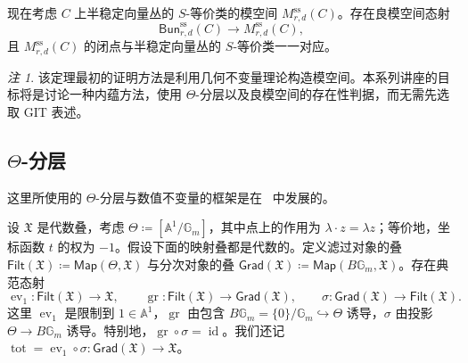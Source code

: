 \documentclass{amsart}
\theoremstyle{definition}
\theoremstyle{remark}
\newtheorem{rmk}[thm]{注}
\theoremstyle{plain}
\theoremstyle{definition}
\theoremstyle{remark}
\newcommand{\A}{\mathbb{A}}
\newcommand{\G}{\mathbb{G}}
\newcommand{\mf}[1]{\mathfrak{#1}}
\newcommand{\mr}[1]{\mathrm{#1}}
\newcommand{\on}[1]{\operatorname{#1}}
\newcommand{\ms}[1]{\mathsf{#1}}
\newcommand{\1}{\mathbf{1}}
\newcommand{\2}{\mathbf{2}}
\newcommand{\3}{\mathbf{3}}
\DeclareMathOperator{\ev}{ev}
\begin{document}
现在考虑 \(C\) 上半稳定向量丛的 \(S\)-等价类的模空间 \(M_{r,d}^{\mr{ss}}(C)\)。存在良模空间态射
\[
    \ms{Bun}_{r,d}^{\mr{ss}}(C)\longrightarrow M_{r,d}^{\mr{ss}}(C),
\]
且 \(M_{r,d}^{\mr{ss}}(C)\) 的闭点与半稳定向量丛的 \(S\)-等价类一一对应。

\begin{rmk}
    该定理最初的证明方法是利用几何不变量理论构造模空间。本系列讲座的目标将是讨论一种内蕴方法，使用 \(\Theta\)-分层以及良模空间的存在性判据，而无需先选取 GIT 表述。
\end{rmk}


\subsection{\(\Theta\)-分层}%
\label{sub:Theta-stratifications}

这里所使用的 \(\Theta\)-分层与数值不变量的框架是在~\cite{HLinstability} 中发展的。

设 \(\mf{X}\) 是代数叠，考虑 \(\Theta\coloneqq[\A^1/\G_m]\)，其中点上的作用为 \(\lambda\cdot z=\lambda z\)；等价地，坐标函数 \(t\) 的权为 \(-1\)。假设下面的映射叠都是代数的。定义滤过对象的叠 \(\ms{Filt}(\mf{X})\coloneqq\ms{Map}(\Theta,\mf{X})\) 与分次对象的叠 \(\ms{Grad}(\mf{X})\coloneqq\ms{Map}(B\G_m,\mf{X})\)。存在典范态射
\[
    \ev_1\colon\ms{Filt}(\mf{X})\to\mf{X},
    \qquad
    \on{gr}\colon\ms{Filt}(\mf{X})\to\ms{Grad}(\mf{X}),
    \qquad
    \sigma\colon\ms{Grad}(\mf{X})\to\ms{Filt}(\mf{X}).
\]
这里 \(\ev_1\) 是限制到 \(1\in\A^1\)，\(\on{gr}\) 由包含 \(B\G_m=\{0\}/\G_m\hookrightarrow\Theta\) 诱导，\(\sigma\) 由投影 \(\Theta\to B\G_m\) 诱导。特别地，\(\on{gr}\circ\sigma=\on{id}\)。我们还记 \(\on{tot}=\ev_1\circ\sigma\colon\ms{Grad}(\mf{X})\to\mf{X}\)。
\end{document}
